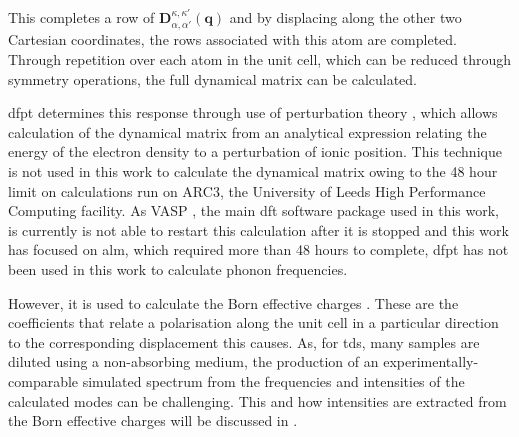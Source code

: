 This completes a row of \(\boldsymbol{D}_{\alpha, \alpha'}^{\kappa, \kappa'} (\boldsymbol{q})\) and by displacing along the other two Cartesian coordinates, the rows associated with this atom are completed. Through repetition over each atom in the unit cell, which can be reduced through symmetry operations, the full dynamical matrix can be calculated. 

\acrshort{dfpt} determines this response through use of perturbation theory \cite{Baroni2001}, which allows calculation of the dynamical matrix from an analytical expression relating the energy of the electron density to a perturbation of ionic position. This technique is not used in this work to calculate the dynamical matrix owing to the 48 hour limit on calculations run on ARC3, the University of Leeds High Performance Computing facility. As VASP \cite{Hafner2008}, the main \acrshort{dft} software package used in this work, is currently is not able to restart this calculation after it is stopped and this work has focused on \acrshort{alm}, which required more than 48 hours to complete, \acrshort{dfpt} has not been used in this work to calculate phonon frequencies. 

However, it is used to calculate the Born effective charges \cite{Gonze1997}. These are the coefficients that relate a polarisation along the unit cell in a particular direction to the corresponding displacement this causes. As, for \acrshort{tds}, many samples are diluted using a non\nobreakdash-absorbing medium, the production of an experimentally\nobreakdash-comparable simulated spectrum from the frequencies and intensities of the calculated modes can be challenging. This and how intensities are extracted from the Born effective charges will be discussed in .

